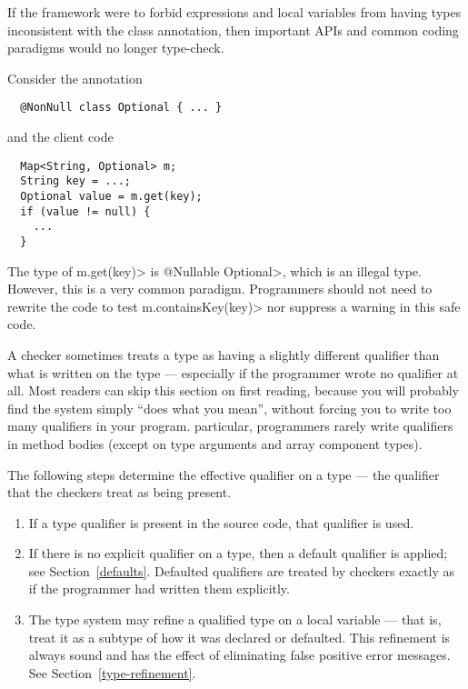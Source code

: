 If the framework were to forbid expressions and local variables from having types inconsistent with the class annotation,
then important APIs and common coding paradigms would no longer type-check.

Consider the annotation
\begin{Verbatim}
  @NonNull class Optional { ... }
\end{Verbatim}
and the client code

\begin{Verbatim}
  Map<String, Optional> m;
  String key = ...;
  Optional value = m.get(key);
  if (value != null) {
    ...
  }
\end{Verbatim}

The type of \<m.get(key)> is \<@Nullable Optional>, which is an illegal type.
However, this is a very common paradigm.  Programmers should not need to rewrite the code to test
\<m.containsKey(key)> nor suppress a warning in this safe code.



A checker sometimes treats a type as having a slightly different qualifier
than what is written on the type --- especially if the programmer wrote no
qualifier at all.
Most readers can skip this section on first reading, because you will
probably find the system simply ``does what you mean'', without forcing
you to write too many qualifiers in your program.
particular, programmers rarely write qualifiers in method bodies (except on
type arguments and array component types).

The following steps determine the effective
qualifier on a type --- the qualifier that the checkers treat as being present.

\begin{enumerate}
\item
  If a type qualifier is present in the source code, that qualifier is used.

\item
  If there is no explicit qualifier on a type, then a default
  qualifier
  is applied; see Section~\ref{defaults}. Defaulted qualifiers are treated by checkers
  exactly as if the programmer had written them explicitly.

\item
  The type system may refine a qualified type on a local variable --- that
  is, treat it as a subtype of how it was declared or defaulted.  This
  refinement is always sound and has the effect of eliminating false
  positive error messages.  See Section~\ref{type-refinement}.

\end{enumerate}

